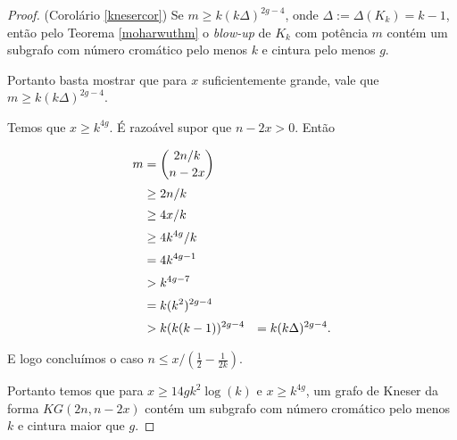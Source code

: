 \begin{proof}{(Corolário \ref{knesercor})}
Se $m \geq k(k\Delta)^{2g-4}$, onde $\Delta := \Delta(K_k) = k-1$, então pelo Teorema \ref{moharwuthm} o \textit{blow-up} de $K_k$ com potência $m$ contém um subgrafo com número cromático pelo menos $k$ e cintura pelo menos $g$.

Portanto basta mostrar que para $x$ suficientemente grande, vale que $m \geq k(k\Delta)^{2g-4}$.

Temos que $x\geq k^{4g}$. É razoável supor que $n-2x > 0$. Então

\begin{equation*}
\setlength{\jot}{5pt}
\begin{aligned}
m &= \binom{2n/k}{n-2x}\\
&\geq 2n/k\\
&\geq 4x/k\\
&\geq 4k^{4g}/k\\
&= 4k^{4g-1}\\
&> k^{4g-7}\\
&= k(k^2)^{2g-4}\\
&> k(k(k-1))^{2g-4}&= k(k\Delta)^{2g-4}.
\end{aligned}
\end{equation*}

E logo concluímos o caso $n \leq x/(\frac{1}{2} - \frac{1}{2k})$.

Portanto temos que para $x \geq 14gk^2\log(k)$ e $x\geq k^{4g}$, um grafo de Kneser da forma $KG(2n,n-2x)$ contém um subgrafo com número cromático pelo menos $k$ e cintura maior que $g$.





\end{proof}


